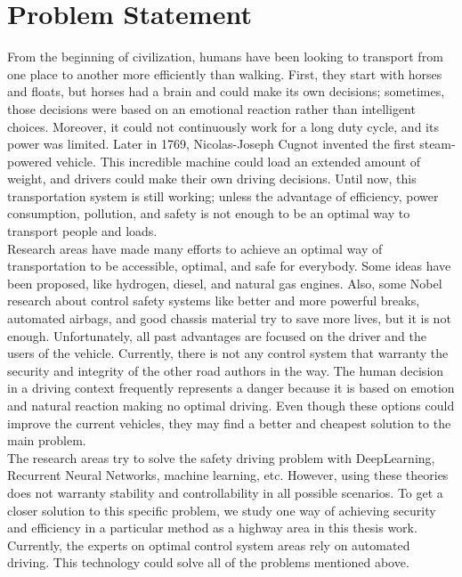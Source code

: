 \chapter{Problem Statement}

From the beginning of civilization, humans have been looking to transport from one place to another more efficiently than walking. First, they start with horses and floats, but horses had a brain and could make its own decisions; sometimes, those decisions were based on an emotional reaction rather than intelligent choices. Moreover, it could not continuously work for a long duty cycle, and its power was limited. Later in 1769, Nicolas-Joseph Cugnot invented the first steam-powered vehicle. This incredible machine could load an extended amount of weight, and drivers could make their own driving decisions. Until now, this transportation system is still working; unless the advantage of efficiency, power consumption, pollution, and safety is not enough to be an optimal way to transport people and loads.\\

Research areas have made many efforts to achieve an optimal way of transportation to be accessible, optimal, and safe for everybody. Some ideas have been proposed, like hydrogen, diesel, and natural gas engines. Also, some Nobel research about control safety systems like better and more powerful breaks, automated airbags, and good chassis material try to save more lives, but it is not enough. Unfortunately, all past advantages are focused on the driver and the users of the vehicle. Currently, there is not any control system that warranty the security and integrity of the other road authors in the way. The human decision in a driving context frequently represents a danger because it is based on emotion and natural reaction making no optimal driving. Even though these options could improve the current vehicles, they may find a better and cheapest solution to the main problem.\\

The research areas try to solve the safety driving problem with DeepLearning, Recurrent Neural Networks, machine learning, etc. However, using these theories does not warranty stability and controllability in all possible scenarios. To get a closer solution to this specific problem, we study one way of achieving security and efficiency in a particular method as a highway area in this thesis work. Currently, the experts on optimal control system areas rely on automated driving. This technology could solve all of the problems mentioned above.\\

